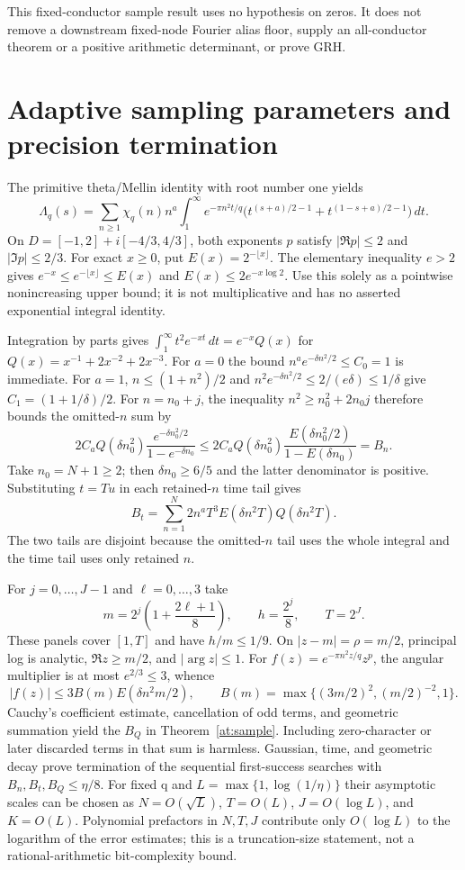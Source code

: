 \documentclass[11pt,oneside,openany]{book}
\theoremstyle{definition}\newtheorem{definition}[theorem]{Definition}
\theoremstyle{remark}\newtheorem{remark}[theorem]{Remark}
\begin{document}
This fixed-conductor sample result uses no hypothesis on zeros.
It does not remove a downstream fixed-node Fourier alias floor, supply
an all-conductor theorem or a positive arithmetic determinant, or prove GRH.

\section{Adaptive sampling parameters and precision termination}\label{at:details}
The primitive theta/Mellin identity with root number one yields
\[
 \Lambda_q(s)=\sum_{n\ge1}\chi_q(n)n^a
 \int_1^\infty e^{-\pi n^2t/q}
 \bigl(t^{(s+a)/2-1}+t^{(1-s+a)/2-1}\bigr)\,dt.
\]
On $D=[-1,2]+i[-4/3,4/3]$, both exponents $p$ satisfy
$|\Re p|\le2$ and $|\Im p|\le2/3$.
For exact $x\ge0$, put $E(x)=2^{-\lfloor x\rfloor}$.
The elementary inequality $e>2$ gives
$e^{-x}\le e^{-\lfloor x\rfloor}\le E(x)$ and
$E(x)\le2e^{-x\log2}$.
Use this solely as a pointwise nonincreasing upper bound; it is not
multiplicative and has no asserted exponential integral identity.

Integration by parts gives
$\int_1^\infty t^2e^{-xt}\,dt=e^{-x}Q(x)$ for
$Q(x)=x^{-1}+2x^{-2}+2x^{-3}$.
For $a=0$ the bound $n^ae^{-\delta n^2/2}\le C_0=1$ is immediate.
For $a=1$, $n\le(1+n^2)/2$ and
$n^2e^{-\delta n^2/2}\le2/(e\delta)\le1/\delta$ give
$C_1=(1+1/\delta)/2$.
For $n=n_0+j$, the inequality
$n^2\ge n_0^2+2n_0j$ therefore bounds the omitted-$n$ sum by
\[
 2C_aQ(\delta n_0^2)
 \frac{e^{-\delta n_0^2/2}}{1-e^{-\delta n_0}}
 \le2C_aQ(\delta n_0^2)
 \frac{E(\delta n_0^2/2)}{1-E(\delta n_0)}=B_n.
\]
Take $n_0=N+1\ge2$; then $\delta n_0\ge6/5$ and the latter denominator
is positive. Substituting $t=Tu$ in each retained-$n$ time tail gives
\[
 B_t=\sum_{n=1}^N2n^aT^3E(\delta n^2T)Q(\delta n^2T).
\]
The two tails are disjoint because the omitted-$n$ tail uses the whole
integral and the time tail uses only retained $n$.

For $j=0,\ldots,J-1$ and $\ell=0,\ldots,3$ take
\[
 m=2^j\left(1+\frac{2\ell+1}{8}\right),\qquad h=\frac{2^j}{8},
 \qquad T=2^J.
\]
These panels cover $[1,T]$ and have $h/m\le1/9$.
On $|z-m|=\rho=m/2$, principal log is analytic,
$\Re z\ge m/2$, and $|\arg z|\le1$.
For $f(z)=e^{-\pi n^2z/q}z^p$, the angular multiplier is at most
$e^{2/3}\le3$, whence
\[
 |f(z)|\le3B(m)E(\delta n^2m/2),\qquad
 B(m)=\max\{(3m/2)^2,(m/2)^{-2},1\}.
\]
Cauchy's coefficient estimate, cancellation of odd terms, and geometric
summation yield the $B_Q$ in Theorem~\ref{at:sample}.
Including zero-character or later discarded terms in that sum is harmless.
Gaussian, time, and geometric decay prove termination of the sequential
first-success searches with $B_n,B_t,B_Q\le\eta/8$.
For fixed q and $L=\max\{1,\log(1/\eta)\}$ their asymptotic scales can be
chosen as $N=O(\sqrt L)$, $T=O(L)$, $J=O(\log L)$, and $K=O(L)$.
Polynomial prefactors in $N,T,J$ contribute only $O(\log L)$ to the
logarithm of the error estimates; this is a truncation-size statement,
not a rational-arithmetic bit-complexity bound.
\end{document}
